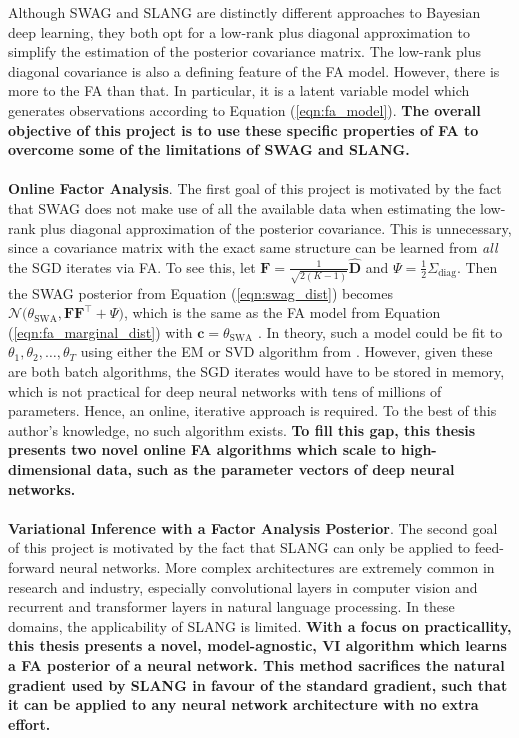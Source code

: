 \documentclass[msc,deptreport.inf]{infthesis} %
\newcommand{\matr}[1]{\mathbf{#1}}
\begin{document}
Although SWAG and SLANG are distinctly different approaches to Bayesian deep learning, they both opt for a low-rank plus diagonal approximation to simplify the estimation of the posterior covariance matrix. The low-rank plus diagonal covariance is also a defining feature of the FA model. However, there is more to the FA than that. In particular, it is a latent variable model which generates observations according to Equation (\ref{eqn:fa_model}). \textbf{The overall objective of this project is to use these specific properties of FA to overcome some of the limitations of SWAG and SLANG.}
\\ \\
\textbf{Online Factor Analysis}.
The first goal of this project is motivated by the fact that SWAG does not make use of all the available data when estimating the low-rank plus diagonal approximation of the posterior covariance. This is unnecessary, since a covariance matrix with the exact same structure can be learned from \emph{all} the SGD iterates via FA. To see this, let $\matr{F} = \frac{1}{\sqrt{2(K-1)}} \hat{\matr{D}}$ and $\Psi = \frac{1}{2} \Sigma_\text{diag}$. Then the SWAG posterior from Equation (\ref{eqn:swag_dist}) becomes $\mathcal{N}\big(\theta_\text{SWA}, \matr{FF}^{\intercal} + \Psi\big)$,
which is the same as the FA model from Equation (\ref{eqn:fa_marginal_dist}) with $\matr{c} = \theta_\text{SWA}$ \cite{brownlie2021}. In theory, such a model could be fit to $\theta_1, \theta_2, \dots, \theta_T$ using either the EM or SVD algorithm from \cite{barber2007}. However, given these are both batch algorithms, the SGD iterates would have to be stored in memory, which is not practical for deep neural networks with tens of millions of parameters. Hence, an online, iterative approach is required. To the best of this author's knowledge, no such algorithm exists. \textbf{To fill this gap, this thesis presents two novel online FA algorithms which scale to high-dimensional data, such as the parameter vectors of deep neural networks.}
\\ \\
\textbf{Variational Inference with a Factor Analysis Posterior}.
The second goal of this project is motivated by the fact that SLANG can only be applied to feed-forward neural networks. More complex architectures are extremely common in research and industry, especially convolutional layers \cite{krizhevsky09} in computer vision and recurrent \cite{hochreiter1997} and transformer \cite{vaswani2017} layers in natural language processing. In these domains, the applicability of SLANG is limited. \textbf{With a focus on practicallity, this thesis presents a novel, model-agnostic, VI algorithm which learns a FA posterior of a neural network. This method sacrifices the natural gradient used by SLANG in favour of the standard gradient, such that it can be applied to any neural network architecture with no extra effort.} 
\end{document}

